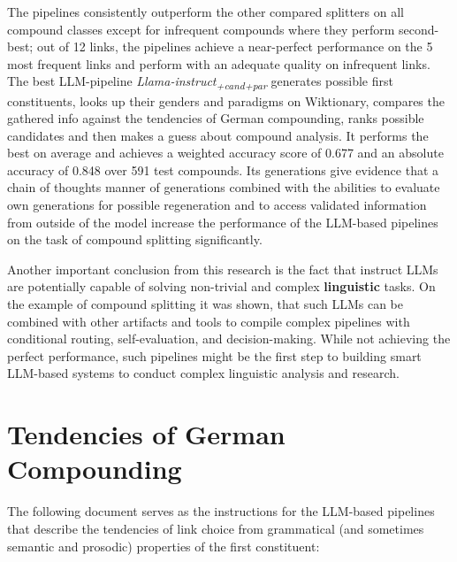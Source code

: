 \documentclass[11pt]{article}
\begin{document}
The pipelines consistently outperform the other compared splitters on all compound classes except for infrequent compounds where they perform second-best; out of 12 links, the pipelines achieve a near-perfect performance on the 5 most frequent links and perform with an adequate quality on infrequent links. The best LLM-pipeline \textit{Llama-instruct\textsubscript{+cand+par}} generates possible first constituents, looks up their genders and paradigms on Wiktionary, compares the gathered info against the tendencies of German compounding, ranks possible candidates and then makes a guess about compound analysis. It performs the best on average and achieves a weighted accuracy score of 0.677 and an absolute accuracy of 0.848 over 591 test compounds. Its generations give evidence that a chain of thoughts manner of generations combined with the abilities to evaluate own generations for possible regeneration and to access validated information from outside of the model increase the performance of the LLM-based pipelines on the task of compound splitting significantly.

Another important conclusion from this research is the fact that instruct LLMs are potentially capable of solving non-trivial and complex \textbf{linguistic} tasks. On the example of compound splitting it was shown, that such LLMs can be combined with other artifacts and tools to compile complex pipelines with conditional routing, self-evaluation, and decision-making. While not achieving the perfect performance, such pipelines might be the first step to building smart LLM-based systems to conduct complex linguistic analysis and research.




% 

\appendix
\section{Tendencies of German Compounding}
\label{sec:appendix:a}

The following document serves as the instructions for the LLM-based pipelines that describe the tendencies of link choice from grammatical (and sometimes semantic and prosodic) properties of the first constituent:

{
    \setcounter{secnumdepth}{0}
    \small
    \setcounter{secnumdepth}{3}  %
}
\end{document}
